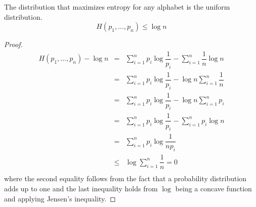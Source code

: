 %

\begin{lemma}
\label{lem:uniform}
The distribution that maximizes entropy for any alphabet is the uniform distribution.
\begin{equation*}
H(p_1, ..., p_n)\leq \log n
\end{equation*}
\end{lemma}
\begin{proof}
\begin{eqnarray}
H(p_1, ..., p_n)  - \log n & =      & \sum_{i=1}^n p_i \log \dfrac{1}{p_i} - \sum_{i=1}^n \dfrac{1}{n} \log n \nonumber \\
                                       & =      & \sum_{i=1}^n p_i \log \dfrac{1}{p_i} - \log n \sum_{i=1}^n \dfrac{1}{n} \nonumber \\
                                       & =      & \sum_{i=1}^n p_i \log \dfrac{1}{p_i} - \log n \sum_{i=1}^n p_i \nonumber \\
                                       & =      & \sum_{i=1}^n p_i \log \dfrac{1}{p_i} - \sum_{i=1}^n p_i \log n \nonumber \\
                                       & =      & \sum_{i=1}^n p_i \log \dfrac{1}{np_i} \nonumber \\                                      
                                       & \leq &  \log \sum_{i=1}^n \dfrac{1}{n} = 0\nonumber \\
\end{eqnarray}
\noindent where the second equality follows from the fact that a probability distribution adds up to one and the last inequality holds from $\log$ being a concave function and applying Jensen's inequality.
\end{proof}

